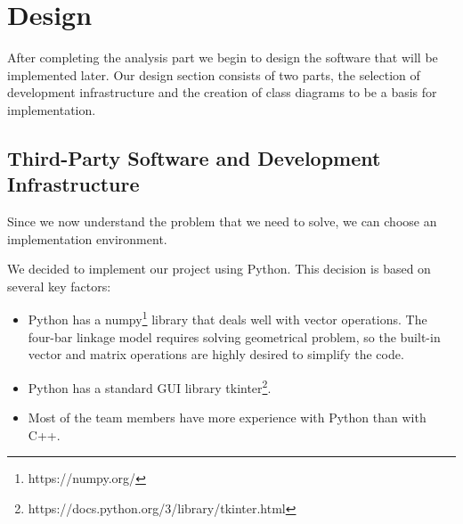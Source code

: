 \documentclass{article}
\begin{document}




\section{Design} \label{ch:design}

After completing the analysis part we begin to design the software that will be implemented later. Our design section consists of two parts, the selection of development infrastructure and the creation of class diagrams to be a basis for implementation.

\subsection{Third-Party Software and Development Infrastructure}

Since we now understand the problem that we need to solve, we can choose an implementation environment.

We decided to implement our project using Python. This decision is based on several key factors:
\begin{itemize}
	\item Python has a numpy\footnote{\label{fn:numpy} https://numpy.org/} library that deals well with vector operations. The four-bar linkage model requires solving geometrical problem, so the built-in vector and matrix operations are highly desired to simplify the code.
	\item Python has a standard GUI library tkinter\footnote{\label{fn:tkinter} https://docs.python.org/3/library/tkinter.html}.
	\item Most of the team members have more experience with Python than with C++.
\end{itemize}
\end{document}
